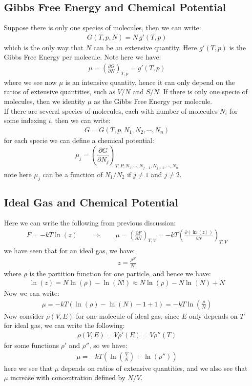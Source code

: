 \documentclass[11pt,oneside]{book}
\theoremstyle{break}
\theoremstyle{break}
\newcommand{\pd}{\partial}
\newcommand{\lr}[1]{\left( #1 \right)}
\begin{document}
\subsection*{Gibbs Free Energy and Chemical Potential}
Suppose there is only one species of molecules, then we can write:
\begin{align*}
G(T,p, N) = N \, g'(T,p)
\end{align*}
which is the only way that $N$ can be an extensive quantity. Here $g'(T,p)$ is the Gibbs Free Energy per molecule. Note here we have:
\begin{align*}
\mu = \lr{\frac{\pd G}{\pd N}}_{T,p} = g'(T,p)
\end{align*}
where we see now $\mu$ is an intensive quantity, hence it can only depend on the ratios of extensive quantities, such as $V/N$ and $S/N$. If there is only one specie of molecules, then we identity $\mu$ as the Gibbs Free Energy per molecule.\\

If there are several species of molecules, each with number of molecules $N_i$ for some indexing $i$, then we can write:
\begin{align*}
G = G(T,p, N_1, N_2, \cdots, N_n)
\end{align*}
for each specie we can define a chemical potential: 
$$\mu_j = \lr{\frac{\pd G}{\pd N_j}}_{T,P, N_1,\cdots, N_{j-1}, N_{j+1}, \cdots, N_n}$$
note here $\mu_j$ can be a function of $N_1/N_2$ if $j \neq 1$ and $j \neq 2$. \\

\subsection*{Ideal Gas and Chemical Potential}
Here we can write the following from previous discussion:
\begin{align*}
F = -kT\ln(z) \qquad \Rightarrow \qquad \mu = \lr{\frac{\pd F}{\pd N}}_{T,V} = -kT \lr{\frac{\pd (\ln(z))}{\pd N}}_{T,V}
\end{align*}
we have seen that for an ideal gas, we have:
\begin{align*}
z = \frac{\rho^N}{N!}
\end{align*}
where $\rho$ is the partition function for one particle, and hence we have:
\begin{align*}
\ln(z) = N \ln (\rho) - \ln(N!) \approx N \ln(\rho) - N \ln(N) + N
\end{align*}
Now we can write:
\begin{align*}
\mu = -kT(\ln(\rho) - \ln(N) - 1 + 1) = -kT \ln\lr{\frac{\rho}{N}}
\end{align*}
Now consider $\rho(V,E)$ for one molecule of ideal gas, since $E$ only depends on $T$ for ideal gas, we can write the following:
\begin{align*}
\rho(V,E) = V\rho'(E) = V\rho''(T)
\end{align*}
for some functions $\rho'$ and $\rho''$, so we have:
\begin{align*}
\mu = -kT \left( \ln\lr{\frac{V}{N}} + \ln(\rho'')\right)
\end{align*}
here we see that $\mu$ depends on ratios of extensive quantities, and we also see that $\mu$ increase with concentration defined by $N/V$. 
\newpage
\end{document}
